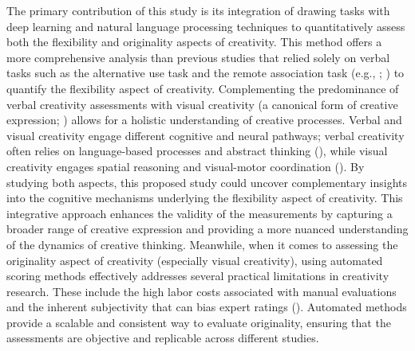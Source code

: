 \documentclass[../MA_Thesis.tex]{subfiles}
\begin{document}
The primary contribution of this study is its integration of drawing tasks with deep learning and natural language processing techniques to quantitatively assess both the flexibility and originality aspects of creativity. This method offers a more comprehensive analysis than previous studies that relied solely on verbal tasks such as the alternative use task and the remote association task (e.g., \cite{kenett_investigating_2014}; \cite{kenett_flexibility_2018}) to quantify the flexibility aspect of creativity. Complementing the predominance of verbal creativity assessments with visual creativity (a canonical form of creative expression; \cite{morrisskay_evolution_2010}) allows for a holistic understanding of creative processes. Verbal and visual creativity engage different cognitive and neural pathways; verbal creativity often relies on language-based processes and abstract thinking (\cite{benedek_create_2014}), while visual creativity engages spatial reasoning and visual-motor coordination (\cite{schlegel_artist_2015}). By studying both aspects, this proposed study could uncover complementary insights into the cognitive mechanisms underlying the flexibility aspect of creativity. This integrative approach enhances the validity of the measurements by capturing a broader range of creative expression and providing a more nuanced understanding of the dynamics of creative thinking. Meanwhile, when it comes to assessing the originality aspect of creativity (especially visual creativity), using automated scoring methods effectively addresses several practical limitations in creativity research. These include the high labor costs associated with manual evaluations and the inherent subjectivity that can bias expert ratings (\cite{patterson_audra_2023}). Automated methods provide a scalable and consistent way to evaluate originality, ensuring that the assessments are objective and replicable across different studies.
\end{document}
